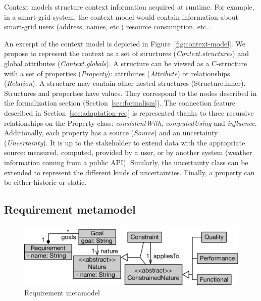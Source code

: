 Context models structure context information acquired at runtime. 
For example, in a smart-grid system, the context model would contain information about smart-grid users (address, names, etc.) resource consumption, etc..

An excerpt of the context model is depicted in Figure~\ref{fig:context-model}. We propose to represent the context as a set of structures (\textit{Context.structures}) and global attributes (\textit{Context.globals}). A structure can be viewed as a C-structure with a set of properties (\textit{Property}): attributes (\textit{Attribute}) or relationships (\textit{Relation}).  A structure may contain other nested structures (Structure.inner).  
Structures and properties have values. They correspond to the nodes described in the formalization section (\cf Section~\ref{sec:formalism}). The connection feature described in Section~\ref{sec:adaptation-req} is represented thanks to three recursive relationships on the Property class: \textit{consistentWith}, \textit{computedUsing} and \textit{influence}. Additionally, each property has a source (\textit{Source}) and an uncertainty (\textit{Uncertainty}). It is up to the stakeholder to extend data with the appropriate source: measured, computed, provided by a user, or by another system (\eg weather information coming from a public API).
Similarly, the uncertainty class can be extended to represent the different kinds of uncertainties. Finally, a property can be either historic or static.

\subsection{Requirement metamodel}

\begin{figure}
	\centering
	\includegraphics[width=\linewidth]{img/chapt-tkm/mm/requirementModel}
	\caption{Requirement metamodel}
	\label{fig:requirement-model}
\end{figure}

